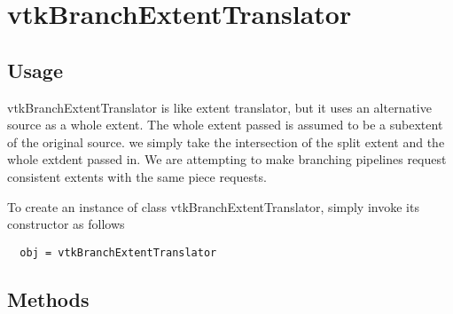 \section{vtkBranchExtentTranslator}

\subsection{Usage}

 vtkBranchExtentTranslator is like extent translator, but it uses an 
 alternative source as a whole extent. The whole extent passed is assumed 
 to be a subextent of the original source.  we simply take the intersection 
 of the split extent and the whole extdent passed in.  We are attempting to
 make branching pipelines request consistent extents with the same piece 
 requests.  

To create an instance of class vtkBranchExtentTranslator, simply
invoke its constructor as follows
\begin{verbatim}
  obj = vtkBranchExtentTranslator
\end{verbatim}
\subsection{Methods}

